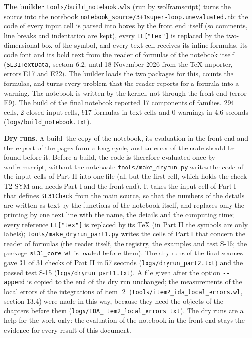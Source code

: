 \documentclass[
  10pt,
]{article}
\begin{document}
\textbf{The builder} \texttt{tools/build\_notebook.wls} (run by
wolframscript) turns the source into the notebook
\texttt{notebook\_source/3+1super-loop.unevaluated.nb}: the code of
every input cell is parsed into boxes by the front end itself (so
comments, line breaks and indentation are kept), every
\texttt{LL{[}"tex"{]}} is replaced by the two-dimensional box of the
symbol, and every text cell receives its inline formulas, its code font
and its bold text from the reader of formulas of the notebook itself
(\texttt{SL31TextData}, section 6.2; until 18 November 2026 from the TeX
importer, errors E17 and E22). The builder loads the two packages for
this, counts the formulas, and turns every problem that the reader
reports for a formula into a warning. The notebook is written by the
kernel, not through the front end (error E9). The build of the final
notebook reported 17 components of families, 294 cells, 2 closed input
cells, 917 formulas in text cells and 0 warnings in 4.6 seconds
(\texttt{logs/build\_notebook.txt}).

\textbf{Dry runs.} A build, the copy of the notebook, its evaluation in
the front end and the export of the pages form a long cycle, and an
error of the code should be found before it. Before a build, the code is
therefore evaluated once by wolframscript, without the notebook:
\texttt{tools/make\_dryrun.py} writes the code of the input cells of
Part II into one file (all but the first cell, which holds the check
T2-SYM and needs Part I and the front end). It takes the input cell of
Part I that defines \texttt{SL31Check} from the main source, so that the
numbers of the details are written as text by the functions of the
notebook itself, and replaces only the printing by one text line with
the name, the details and the computing time; every reference
\texttt{LL{[}"tex"{]}} is replaced by its TeX (in Part II the symbols
are only labels); \texttt{tools/make\_dryrun\_part1.py} writes the cells
of Part I that concern the reader of formulas (the reader itself, the
registry, the examples and test S-15; the package \texttt{sl31\_core.wl}
is loaded before them). The dry runs of the final sources gave 31 of 31
checks of Part II in 57 seconds (\texttt{logs/dryrun\_part2.txt}) and
the passed test S-15 (\texttt{logs/dryrun\_part1.txt}). A file given
after the option \texttt{-\/-append} is copied to the end of the dry run
unchanged; the measurements of the local errors of the integrations of
item {[}2{]} (\texttt{tools/item2\_ida\_local\_errors.wl}, section 13.4)
were made in this way, because they need the objects of the chapters
before them (\texttt{logs/IDA\_item2\_local\_errors.txt}). The dry runs
are a help for the work only: the evaluation of the notebook in the
front end stays the evidence for every result of this document.
\end{document}
